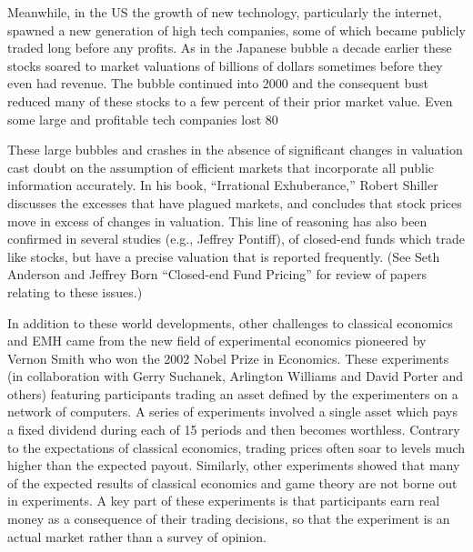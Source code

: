 Meanwhile, in the US the growth of new technology, particularly the internet, spawned a new generation of high tech companies, some of which became publicly traded long before any profits. As in the Japanese bubble a decade earlier these stocks soared to market valuations of billions of dollars sometimes before they even had revenue. The bubble continued into 2000 and the consequent bust reduced many of these stocks to a few percent of their prior market value. Even some large and profitable tech companies lost 80%
 
These large bubbles and crashes in the absence of significant changes in valuation cast doubt on the assumption of efficient markets that incorporate all public information accurately. In his book, “Irrational Exhuberance,” Robert Shiller discusses the excesses that have plagued markets, and concludes that stock prices move in excess of changes in valuation. This line of reasoning has also been confirmed in several studies (e.g., Jeffrey Pontiff), of closed-end funds which trade like stocks, but have a precise valuation that is reported frequently. (See Seth Anderson and Jeffrey Born “Closed-end Fund Pricing” for review of papers relating to these issues.)
 
In addition to these world developments, other challenges to classical economics and EMH came from the new field of experimental economics pioneered by Vernon Smith who won the 2002 Nobel Prize in Economics. These experiments (in collaboration with Gerry Suchanek, Arlington Williams and David Porter and others) featuring participants trading an asset defined by the experimenters on a network of computers. A series of experiments involved a single asset which pays a fixed dividend during each of 15 periods and then becomes worthless. Contrary to the expectations of classical economics, trading prices often soar to levels much higher than the expected payout. Similarly, other experiments showed that many of the expected results of classical economics and game theory are not borne out in experiments. A key part of these experiments is that participants earn real money as a consequence of their trading decisions, so that the experiment is an actual market rather than a survey of opinion.
 
